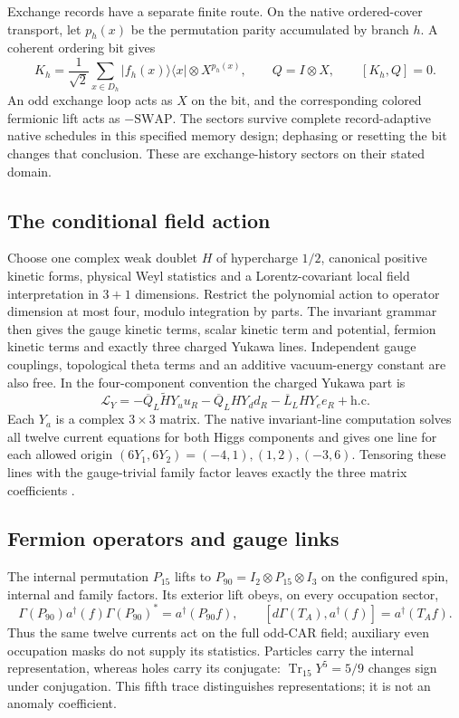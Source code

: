 \documentclass[11pt]{article}
\begin{document}
Exchange records have a separate finite route. On the native ordered-cover
transport, let $p_h(x)$ be the permutation parity accumulated by branch $h$. A
coherent ordering bit gives
\[
 K_h=\frac1{\sqrt2}\sum_{x\in D_h}|f_h(x)\rangle\langle x|
             \otimes X^{p_h(x)},\qquad Q=I\otimes X,
 \qquad [K_h,Q]=0.
\]
An odd exchange loop acts as $X$ on the bit, and the corresponding colored
fermionic lift acts as $-\mathrm{SWAP}$. The sectors survive complete
record-adaptive native schedules in this specified memory design; dephasing or
resetting the bit changes that conclusion. These are exchange-history sectors
on their stated domain.

\subsection{The conditional field action}
\label{sec:conditional-field-action}

Choose one complex weak doublet $H$ of hypercharge $1/2$, canonical positive
kinetic forms, physical Weyl statistics and a Lorentz-covariant local field
interpretation in $3+1$ dimensions. Restrict the polynomial action to operator
dimension at most four, modulo integration by parts. The invariant grammar
then gives the gauge kinetic terms, scalar kinetic term and potential,
fermion kinetic terms and exactly three charged Yukawa lines. Independent
gauge couplings, topological theta terms and an additive vacuum-energy
constant are also free. In the four-component convention the charged Yukawa
part is
\[
 \mathcal L_Y=-\overline Q_L\widetilde H Y_u u_R
             -\overline Q_L H Y_d d_R
             -\overline L_L H Y_e e_R+\mathrm{h.c.}
\]
Each $Y_a$ is a complex $3\times3$ matrix. The native invariant-line computation
solves all twelve current equations for both Higgs components and gives one
line for each allowed origin $(6Y_1,6Y_2)=(-4,1),(1,2),(-3,6)$.
Tensoring these lines with the gauge-trivial family factor leaves exactly the
three matrix coefficients \cite{ophGauge,pwweinberg1967model,pwpeskin1995introduction}.

\subsection{Fermion operators and gauge links}

The internal permutation $P_{15}$ lifts to
$P_{90}=I_2\otimes P_{15}\otimes I_3$ on the configured spin, internal and
family factors. Its exterior lift obeys, on every occupation sector,
\[
 \Gamma(P_{90})a^\dagger(f)\Gamma(P_{90})^*=a^\dagger(P_{90}f),
 \qquad[d\Gamma(T_A),a^\dagger(f)]=a^\dagger(T_Af).
\]
Thus the same twelve currents act on the full odd-CAR field; auxiliary
even occupation masks do not supply its statistics. Particles carry the
internal representation, whereas holes carry its conjugate:
$\operatorname{Tr}_{15}Y^5=5/9$ changes sign under conjugation. This fifth
trace distinguishes representations; it is not an anomaly coefficient.
\end{document}
